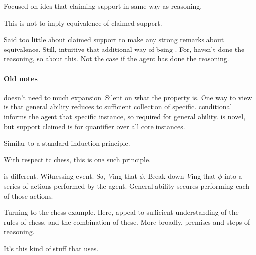 \begin{note}
  Focused on idea that claiming support in same way as reasoning.

  This is not to imply equivalence of claimed support.

  Said too little about claimed support to make any strong remarks about equivalence.
  Still, intuitive that additional way of being \mom{}.
  For, haven't done the reasoning, so \mom{} about this.
  Not the case if the agent has done the reasoning.
\end{note}

\paragraph{Old notes}

\begin{note}
  \AR{} doesn't need to much expansion.
  Silent on what the property is.
  One way to view is that general ability reduces to sufficient collection of specific.
  \gsi{} conditional informs the agent that specific instance, so required for general ability.
  \gsi{} is novel, but support claimed is for quantifier over all core instances.

  Similar to a standard induction principle.

  With respect to chess, this is one such principle.
\end{note}

\begin{note}
  \WR{} is different.
  Witnessing event.
  So, \emph{V}ing that \(\phi\).
  Break down \emph{V}ing that \(\phi\) into a series of actions performed by the agent.
  General ability secures performing each of those actions.



  Turning to the chess example.
  Here, appeal to sufficient understanding of the rules of chess, and the combination of these.
  More broadly, premises and steps of reasoning.

  It's this kind of stuff that \WR{} uses.
\end{note}


